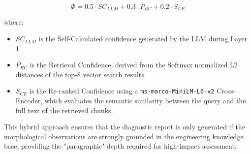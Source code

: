 \begin{equation}
    \Phi = 0.5 \cdot SC_{LLM} + 0.3 \cdot P_{RC} + 0.2 \cdot S_{CE}
\end{equation}

\noindent where:
\begin{itemize}[noitemsep,leftmargin=1.5em]
    \item $SC_{LLM}$ is the Self-Calculated confidence generated by the LLM during Layer 1.
    \item $P_{RC}$ is the Retrieval Confidence, derived from the Softmax normalized L2 distances of the top-8 vector search results.
    \item $S_{CE}$ is the Re-ranked Confidence using a \texttt{ms-marco-MiniLM-L6-v2} Cross-Encoder, which evaluates the semantic similarity between the query and the full text of the retrieved chunks.
\end{itemize}

\begin{sloppypar}
This hybrid approach ensures that the diagnostic report is only generated if the morphological observations are strongly grounded in the engineering knowledge base, providing the "paragraphic" depth required for high-impact assessment.
\end{sloppypar}
